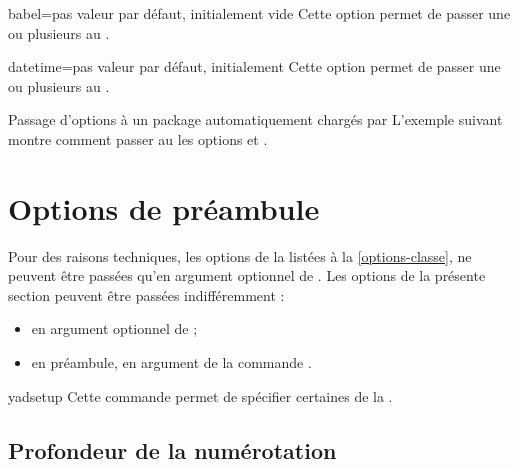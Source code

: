 \begin{docKey}{babel}{=}{pas valeur par défaut,
    initialement vide}
  Cette option permet de passer une ou plusieurs  au
  .
\end{docKey}
\begin{docKey}{datetime}{=}{pas valeur par défaut,
    initialement }
  Cette option permet de passer une ou plusieurs  au
  .
\end{docKey}
%
%

\begin{dbexample}{Passage d'options à un package  automatiquement chargés par \yat}{}
  L'exemple suivant montre comment passer au  les options
   et .
\end{dbexample}

\section{Options de préambule}
\label{sec-options-de-preambule}

Pour des raisons techniques, les options de la \yatCl listées à la
\vref{options-classe}, ne peuvent être passées qu'en argument optionnel de
. Les options de la présente section peuvent être
passées indifféremment :
\begin{itemize}
\item en argument optionnel de  ;
\item en préambule, en argument de la commande .
\end{itemize}

\begin{docCommand}{yadsetup}{}
  Cette commande permet de spécifier certaines  de la \yatCl.
\end{docCommand}

\subsection{Profondeur de la numérotation}\label{sec-profondeur-de-la}
%
%

